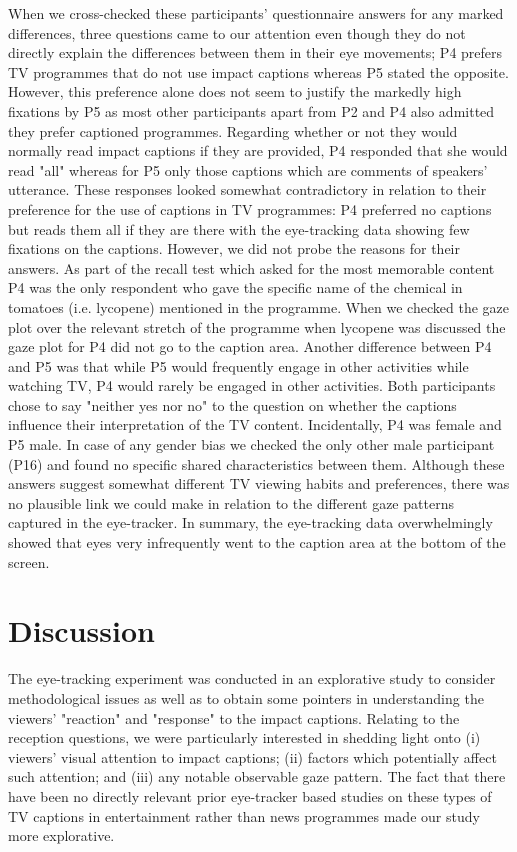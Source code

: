 \documentclass[output=paper]{langsci/langscibook}
\begin{document}
When we cross-checked these participants' questionnaire answers for any marked differences, three questions came to our attention even though they do not directly explain the differences between them in their eye movements; P4 prefers TV programmes that do not use impact captions whereas P5 stated the opposite. However, this preference alone does not seem to justify the markedly high fixations by P5 as most other participants apart from P2 and P4 also admitted they prefer captioned programmes. Regarding whether or not they would normally read impact captions if they are provided, P4 responded that she would read "all" whereas for P5 only those captions which are comments of speakers' utterance. These responses looked somewhat contradictory in relation to their preference for the use of captions in TV programmes: P4 preferred no captions but reads them all if they are there with the eye-tracking data showing few fixations on the captions. However, we did not probe the reasons for their answers. As part of the recall test which asked for the most memorable content P4 was the only respondent who gave the specific name of the chemical in tomatoes (i.e. lycopene) mentioned in the programme. When we checked the gaze plot over the relevant stretch of the programme when lycopene was discussed the gaze plot for P4 did not go to the caption area. Another difference between P4 and P5 was that while P5 would frequently engage in other activities while watching TV, P4 would rarely be engaged in other activities. Both participants chose to say "neither yes nor no" to the question on whether the captions influence their interpretation of the TV content. Incidentally, P4 was female and P5 male. In case of any gender bias we checked the only other male participant (P16) and found no specific shared characteristics between them. Although these answers suggest somewhat different TV viewing habits and preferences, there was no plausible link we could make in relation to the different gaze patterns captured in the eye-tracker.  In summary, the eye-tracking data overwhelmingly showed that eyes very infrequently went to the caption area at the bottom of the screen. 


\section{Discussion}

The eye-tracking experiment was conducted in an explorative study to consider methodological issues as well as to obtain some pointers in understanding the viewers' "reaction" and "response" to the impact captions. Relating to the reception questions, we were particularly interested in shedding light onto (i) viewers' visual attention to impact captions; (ii) factors which potentially affect such attention; and (iii) any notable observable gaze pattern. The fact that there have been no directly relevant prior eye-tracker based studies on these types of TV captions in entertainment rather than news programmes made our study more explorative. 
\end{document}
